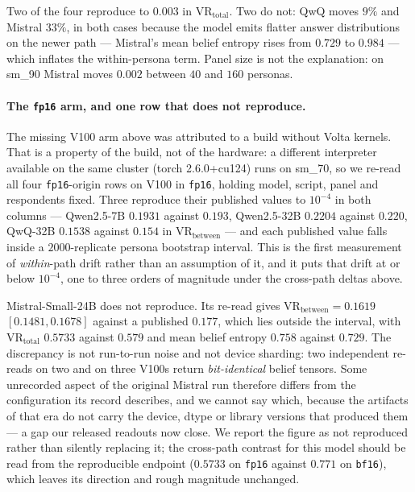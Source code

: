 \documentclass[11pt]{article}
\begin{document}
Two of the four reproduce to $0.003$ in $\mathrm{VR}_\text{total}$. Two do not:
QwQ moves $9\%$ and Mistral $33\%$, in both cases because the model emits
flatter answer distributions on the newer path --- Mistral's mean belief entropy
rises from $0.729$ to $0.984$ --- which inflates the within-persona term. Panel
size is not the explanation: on sm\_90 Mistral moves $0.002$ between $40$ and
$160$ personas.

\paragraph{The \texttt{fp16} arm, and one row that does not reproduce.}
The missing V100 arm above was attributed to a build without Volta kernels. That
is a property of the build, not of the hardware: a different interpreter
available on the same cluster (torch 2.6.0+cu124) runs on sm\_70, so we re-read
all four \texttt{fp16}-origin rows on V100 in \texttt{fp16}, holding model,
script, panel and respondents fixed. Three reproduce their published values to
$10^{-4}$ in both columns --- Qwen2.5-7B $0.1931$ against $0.193$, Qwen2.5-32B
$0.2204$ against $0.220$, QwQ-32B $0.1538$ against $0.154$ in
$\mathrm{VR}_\text{between}$ --- and each published value falls inside a
$2000$-replicate persona bootstrap interval. This is the first measurement of
\emph{within}-path drift rather than an assumption of it, and it puts that drift
at or below $10^{-4}$, one to three orders of magnitude under the cross-path
deltas above.

Mistral-Small-24B does not reproduce. Its re-read gives
$\mathrm{VR}_\text{between}=0.1619$ $[0.1481,0.1678]$ against a published
$0.177$, which lies outside the interval, with
$\mathrm{VR}_\text{total}$ $0.5733$ against $0.579$ and mean belief entropy
$0.758$ against $0.729$. The discrepancy is not run-to-run noise and not device
sharding: two independent re-reads on two and on three V100s return
\emph{bit-identical} belief tensors. Some unrecorded aspect of the original
Mistral run therefore differs from the configuration its record describes, and
we cannot say which, because the artifacts of that era do not carry the device,
dtype or library versions that produced them --- a gap our released readouts now
close. We report the figure as not reproduced rather than silently replacing it;
the cross-path contrast for this model should be read from the reproducible
endpoint ($0.5733$ on \texttt{fp16} against $0.771$ on \texttt{bf16}), which
leaves its direction and rough magnitude unchanged.
\end{document}
